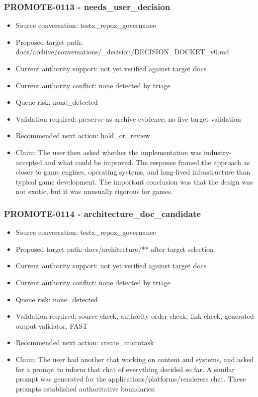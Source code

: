\documentclass[11pt,a4paper]{report}
\begin{document}
\subsubsection{PROMOTE-0113 - needs\_user\_decision}

\begin{itemize}
\item Source conversation: testx\_repox\_governance
\item Proposed target path: docs/archive/conversations/\_decision/DECISION\_DOCKET\_v0.md
\item Current authority support: not yet verified against target docs
\item Current authority conflict: none detected by triage
\item Queue risk: none\_detected
\item Validation required: preserve as archive evidence; no live target validation
\item Recommended next action: hold\_or\_review
\item Claim: The user then asked whether the implementation was industry-accepted and what could be improved. The response framed the approach as closer to game engines, operating systems, and long-lived infrastructure than typical game development. The important conclusion was that the design was not exotic, but it was unusually rigorous for games.
\end{itemize}

\subsubsection{PROMOTE-0114 - architecture\_doc\_candidate}

\begin{itemize}
\item Source conversation: testx\_repox\_governance
\item Proposed target path: docs/architecture/** after target selection
\item Current authority support: not yet verified against target docs
\item Current authority conflict: none detected by triage
\item Queue risk: none\_detected
\item Validation required: source check, authority-order check, link check, generated output validator, FAST
\item Recommended next action: create\_microtask
\item Claim: The user had another chat working on content and systems, and asked for a prompt to inform that chat of everything decided so far. A similar prompt was generated for the applications/platforms/renderers chat. These prompts established authoritative boundaries:
\end{itemize}
\end{document}
